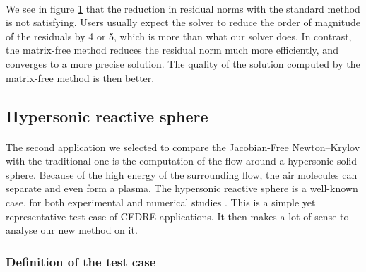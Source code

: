 
        \paragraph{}
        We see in figure \ref{fig:rae_residuals_fine} that the reduction in residual norms with the standard method is not satisfying.
        Users usually expect the solver to reduce the order of magnitude of the residuals by 4 or 5, which is more than what our solver does.
        In contrast, the matrix-free method reduces the residual norm much more efficiently, and converges to a more precise solution.
        The quality of the solution computed by the matrix-free method is then better.

        \begin{figure}
          \centering
          \caption{}
          \label{fig:rae_residuals_fine}
        \end{figure}


    \subsection{Hypersonic reactive sphere}

      \paragraph{}
      The second application we selected to compare the Jacobian-Free Newton--Krylov with the traditional one is the computation of the flow around a hypersonic solid sphere.
      Because of the high energy of the surrounding flow, the air molecules can separate and even form a plasma.
      The hypersonic reactive sphere is a well-known case, for both experimental \cite{Lobb1964} and numerical studies \cite{DobrovGimadievKarpenkoEtAl2022}.
      This is a simple yet representative test case of CEDRE applications.
      It then makes a lot of sense to analyse our new method on it.

      \subsubsection{Definition of the test case}


